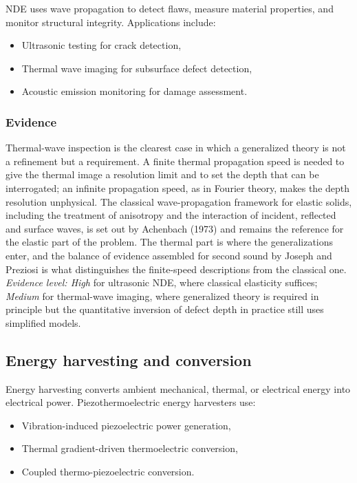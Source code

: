 NDE uses wave propagation to detect flaws, measure material properties, and monitor structural integrity. Applications include:
\begin{itemize}
\item Ultrasonic testing for crack detection,
\item Thermal wave imaging for subsurface defect detection,
\item Acoustic emission monitoring for damage assessment.
\end{itemize}

\subsubsection{Evidence}
Thermal-wave inspection is the clearest case in which a generalized theory is not a refinement but a requirement. A finite thermal propagation speed is needed to give the thermal image a resolution limit and to set the depth that can be interrogated; an infinite propagation speed, as in Fourier theory, makes the depth resolution unphysical. The classical wave-propagation framework for elastic solids, including the treatment of anisotropy and the interaction of incident, reflected and surface waves, is set out by Achenbach (1973) \cite{Achenbach1973} and remains the reference for the elastic part of the problem. The thermal part is where the generalizations enter, and the balance of evidence assembled for second sound by Joseph and Preziosi \cite{Joseph1989,Joseph1990} is what distinguishes the finite-speed descriptions from the classical one. \emph{Evidence level: High} for ultrasonic NDE, where classical elasticity suffices; \emph{Medium} for thermal-wave imaging, where generalized theory is required in principle but the quantitative inversion of defect depth in practice still uses simplified models.

\subsection{Energy harvesting and conversion}
\label{sec:13.3}

Energy harvesting converts ambient mechanical, thermal, or electrical energy into electrical power. Piezothermoelectric energy harvesters use:
\begin{itemize}
\item Vibration-induced piezoelectric power generation,
\item Thermal gradient-driven thermoelectric conversion,
\item Coupled thermo-piezoelectric conversion.
\end{itemize}

